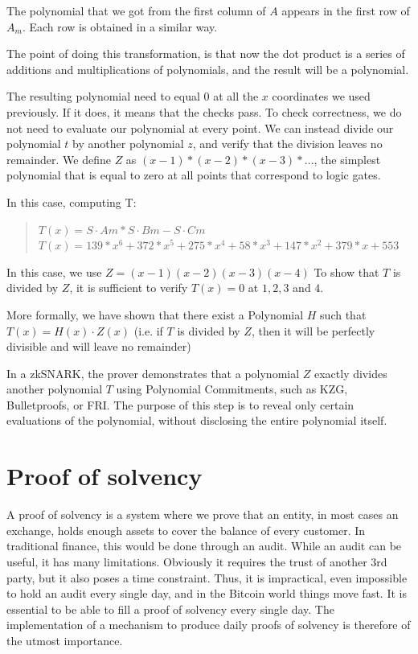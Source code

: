 The polynomial that we got from the first column of $A$ appears in the first row of $A_m$. Each row is obtained in a similar way.

The point of doing this transformation, is that now the dot product is a series of additions and multiplications of polynomials, and the result will be a polynomial.

The resulting polynomial need to equal $0$ at all the $x$ coordinates we used previously.
If it does, it means that the checks pass.
To check correctness, we do not need to evaluate our polynomial at every point. 
We can instead divide our polynomial $t$ by another polynomial $z$, and verify that the division leaves no remainder.
We define $Z$ as $(x - 1) * (x - 2) * (x - 3) * ...$, the simplest polynomial that is equal to zero at all points that correspond to logic gates. 

In this case, computing T:
\begin{quote}
$T(x) = S \cdot Am * S \cdot Bm - S \cdot Cm  $
$T(x) = 139*x^6 + 372*x^5 + 275*x^4 + 58*x^3 + 147*x^2 + 379*x + 553$
\end{quote}

In this case, we use $Z = (x-1)(x-2)(x-3)(x-4)$
To show that $T$ is divided by $Z$, it is sufficient to verify $T(x) = 0$ at $1,2,3$ and $4$.

More formally, we have shown that there exist a Polynomial $H$ such that $T(x)=H(x) \cdot Z(x)$
(i.e. if $T$ is divided by $Z$, then it will be perfectly divisible and will leave no remainder)

In a zkSNARK, the prover demonstrates that a polynomial $Z$ exactly divides another polynomial
$T$ using Polynomial Commitments, such as KZG, Bulletproofs, or FRI. 
The purpose of this step is to reveal only certain evaluations of the polynomial, without disclosing the entire polynomial itself.\cite{VB16}


\section{Proof of solvency}

A proof of solvency is a system where we prove that an entity, in most cases an exchange, holds enough assets to cover
the balance of every customer. In traditional finance, this would be done through an audit. While an audit can be useful,
it has many limitations. Obviously it requires the trust of another 3rd party, but it also poses a time constraint. Thus, it is impractical, even impossible
to hold an audit every single day, and in the Bitcoin world things move fast. It is essential to be able to fill a proof of solvency every single day.
The implementation of a mechanism to produce daily proofs of solvency is therefore of the utmost importance.

